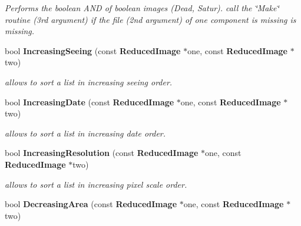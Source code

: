 \begin{CompactItemize}
\begin{CompactList}\small\item\em Performs the boolean AND of boolean images (Dead, Satur). call the \char`\"{}Make\char`\"{} routine (3rd argument) if the file (2nd argument) of one component is missing is missing.\item\end{CompactList}\item 
{}
bool {\bf Increasing\-Seeing} (const {\bf Reduced\-Image} $\ast$one, const {\bf Reduced\-Image} $\ast$two)\label{reducedimage_cc_a27}

\begin{CompactList}\small\item\em allows to sort a list in increasing seeing order.\item\end{CompactList}\item 
{}
bool {\bf Increasing\-Date} (const {\bf Reduced\-Image} $\ast$one, const {\bf Reduced\-Image} $\ast$two)\label{reducedimage_cc_a28}

\begin{CompactList}\small\item\em allows to sort a list in increasing date order.\item\end{CompactList}\item 
{}
bool {\bf Increasing\-Resolution} (const {\bf Reduced\-Image} $\ast$one, const {\bf Reduced\-Image} $\ast$two)\label{reducedimage_cc_a29}

\begin{CompactList}\small\item\em allows to sort a list in increasing pixel scale order.\item\end{CompactList}\item 
{}
bool {\bf Decreasing\-Area} (const {\bf Reduced\-Image} $\ast$one, const {\bf Reduced\-Image} $\ast$two)\label{reducedimage_cc_a30}


\end{CompactItemize}
